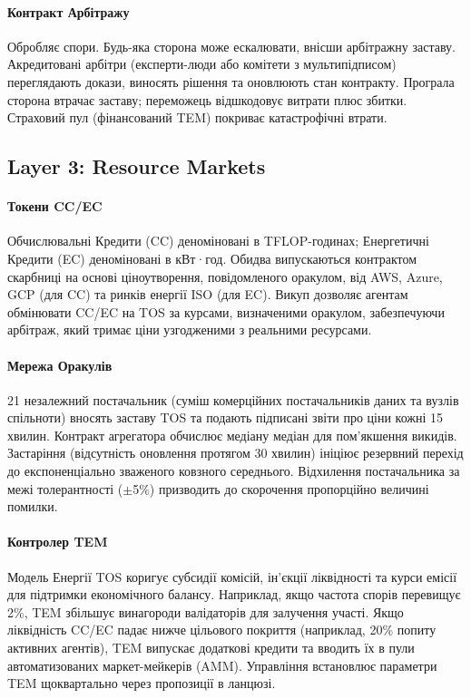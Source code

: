 \documentclass[11pt]{article}
\begin{document}
\paragraph{Контракт Арбітражу} Обробляє спори. Будь-яка сторона може ескалювати, внісши арбітражну заставу. Акредитовані арбітри (експерти-люди або комітети з мультипідписом) переглядають докази, виносять рішення та оновлюють стан контракту. Програла сторона втрачає заставу; переможець відшкодовує витрати плюс збитки. Страховий пул (фінансований TEM) покриває катастрофічні втрати.

\subsection{Layer 3: Resource Markets}
\paragraph{Токени CC/EC} Обчислювальні Кредити (CC) деноміновані в TFLOP-годинах; Енергетичні Кредити (EC) деноміновані в кВт·год. Обидва випускаються контрактом скарбниці на основі ціноутворення, повідомленого оракулом, від AWS, Azure, GCP (для CC) та ринків енергії ISO (для EC). Викуп дозволяє агентам обмінювати CC/EC на TOS за курсами, визначеними оракулом, забезпечуючи арбітраж, який тримає ціни узгодженими з реальними ресурсами.

\paragraph{Мережа Оракулів} 21 незалежний постачальник (суміш комерційних постачальників даних та вузлів спільноти) вносять заставу TOS та подають підписані звіти про ціни кожні 15 хвилин. Контракт агрегатора обчислює медіану медіан для пом'якшення викидів. Застаріння (відсутність оновлення протягом 30 хвилин) ініціює резервний перехід до експоненціально зваженого ковзного середнього. Відхилення постачальника за межі толерантності ($\pm$5\%) призводить до скорочення пропорційно величині помилки.

\paragraph{Контролер TEM} Модель Енергії TOS коригує субсидії комісій, ін'єкції ліквідності та курси емісії для підтримки економічного балансу. Наприклад, якщо частота спорів перевищує 2\%, TEM збільшує винагороди валідаторів для залучення участі. Якщо ліквідність CC/EC падає нижче цільового покриття (наприклад, 20\% попиту активних агентів), TEM випускає додаткові кредити та вводить їх в пули автоматизованих маркет-мейкерів (AMM). Управління встановлює параметри TEM щоквартально через пропозиції в ланцюзі.
\end{document}
